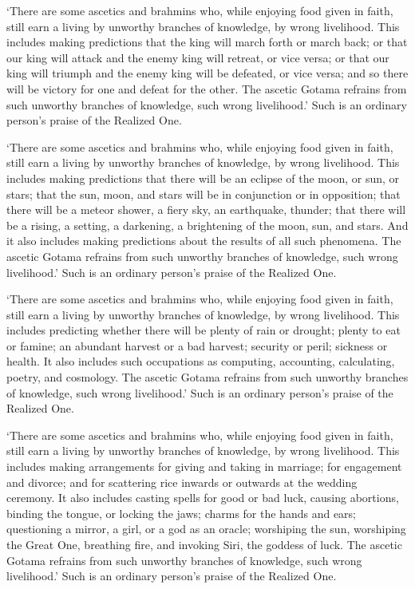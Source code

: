 \documentclass[12pt,openany]{book}%
\begin{document}
‘There are some ascetics and brahmins who, while enjoying food given in faith, still earn a living by unworthy branches of knowledge, by wrong livelihood. This includes making predictions that the king will march forth or march back; or that our king will attack and the enemy king will retreat, or vice versa; or that our king will triumph and the enemy king will be defeated, or vice versa; and so there will be victory for one and defeat for the other. The ascetic Gotama refrains from such unworthy branches of knowledge, such wrong livelihood.’ Such is an ordinary person’s praise of the Realized One. 

‘There are some ascetics and brahmins who, while enjoying food given in faith, still earn a living by unworthy branches of knowledge, by wrong livelihood. This includes making predictions that there will be an eclipse of the moon, or sun, or stars; that the sun, moon, and stars will be in conjunction or in opposition; that there will be a meteor shower, a fiery sky, an earthquake, thunder; that there will be a rising, a setting, a darkening, a brightening of the moon, sun, and stars. And it also includes making predictions about the results of all such phenomena. The ascetic Gotama refrains from such unworthy branches of knowledge, such wrong livelihood.’ Such is an ordinary person’s praise of the Realized One. 

‘There are some ascetics and brahmins who, while enjoying food given in faith, still earn a living by unworthy branches of knowledge, by wrong livelihood. This includes predicting whether there will be plenty of rain or drought; plenty to eat or famine; an abundant harvest or a bad harvest; security or peril; sickness or health. It also includes such occupations as computing, accounting, calculating, poetry, and cosmology. The ascetic Gotama refrains from such unworthy branches of knowledge, such wrong livelihood.’ Such is an ordinary person’s praise of the Realized One. 

‘There are some ascetics and brahmins who, while enjoying food given in faith, still earn a living by unworthy branches of knowledge, by wrong livelihood. This includes making arrangements for giving and taking in marriage; for engagement and divorce; and for scattering rice inwards or outwards at the wedding ceremony. It also includes casting spells for good or bad luck, causing abortions, binding the tongue, or locking the jaws; charms for the hands and ears; questioning a mirror, a girl, or a god as an oracle; worshiping the sun, worshiping the Great One, breathing fire, and invoking Siri, the goddess of luck. The ascetic Gotama refrains from such unworthy branches of knowledge, such wrong livelihood.’ Such is an ordinary person’s praise of the Realized One. 
\end{document}
